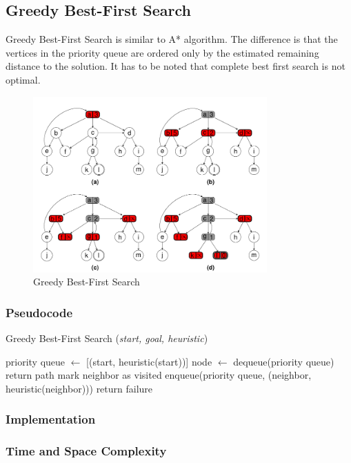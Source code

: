 \subsection{Greedy Best-First Search}
\noindent Greedy Best-First Search is similar to A* algorithm. The difference is that the vertices in the priority queue are ordered only by the estimated remaining distance to the solution. It has to be noted that complete best first search is not optimal.

\begin{figure}[H]
	\centering
	\includegraphics[width=0.8\textwidth]{./imgs/gbfs.png}
	\caption{Greedy Best-First Search}
	\label{fig:GBFS}
\end{figure}

\subsubsection{Pseudocode}
\begin{algorithm}[H]
	\caption{Greedy Best-First Search (\textit{start, goal, heuristic})}
	\label{alg:gbfs}
	\begin{algorithmic}[1]
	\State priority queue $\gets$ [(start, heuristic(start))]
		\State node $\gets$ dequeue(priority queue)
			\State return path
		\EndIf
				\State mark neighbor as visited
				\State enqueue(priority queue, (neighbor, heuristic(neighbor)))
			\EndIf
		\EndFor
	\EndWhile
	\State return failure
	\end{algorithmic}
\end{algorithm}

\subsubsection{Implementation}

\subsubsection{Time and Space Complexity}
